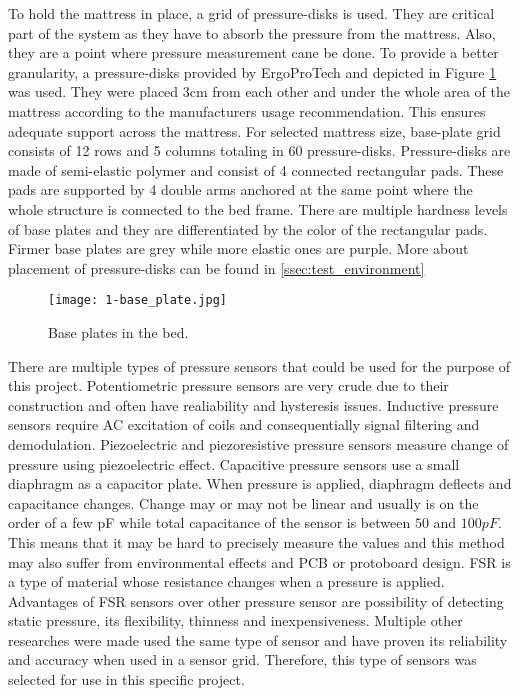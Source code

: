 To hold the mattress in place, a grid of pressure-disks is used. They are critical part of the system as they have to absorb the pressure from the mattress. Also, they are a point where pressure measurement cane be done. To provide a better granularity, a pressure-disks provided by ErgoProTech and depicted in Figure \ref{fig:base-plate} was used. They were placed 3cm from each other and under the whole area of the mattress according to the manufacturers usage recommendation. This ensures adequate support across the mattress. For selected mattress size, base-plate grid consists of 12 rows and 5 columns totaling in 60 pressure-disks. Pressure-disks are made of semi-elastic polymer and consist of 4 connected rectangular pads. These pads are supported by 4 double arms anchored at the same point where the whole structure is connected to the bed frame. There are multiple hardness levels of base plates and they are differentiated by the color of the rectangular pads. Firmer base plates are grey while more elastic ones are purple. More about placement of pressure-disks can be found in \autoref{ssec:test_environment}

\begin{figure}[h]
  \begin{center}
    \texttt{[image: 1-base\_plate.jpg]}
  \end{center}
  \caption{Base plates in the bed.}
  \label{fig:base-plate}
\end{figure}

There are multiple types of pressure sensors that could be used for the purpose of this project\cite{pressure_sensors}. Potentiometric pressure sensors are very crude due to their construction and often have realiability and hysteresis issues. Inductive pressure sensors require \ac{AC} excitation of coils and consequentially signal filtering and demodulation. Piezoelectric and piezoresistive pressure sensors measure change of pressure using piezoelectric effect. Capacitive pressure sensors use a small diaphragm as a capacitor plate. When pressure is applied, diaphragm deflects and capacitance changes. Change may or may not be linear and usually is on the order of a few \ac{pF} while total capacitance of the sensor is between $50$ and $100 pF$. This means that it may be hard to precisely measure the values and this method may also suffer from environmental effects and \ac{PCB} or protoboard design. \ac{FSR} is a type of material whose resistance changes when a pressure is applied. Advantages of \ac{FSR} sensors over other pressure sensor are possibility of detecting static pressure, its flexibility, thinness and inexpensiveness. Multiple other researches were made used the same type of sensor and have proven its reliability and accuracy when used in a sensor grid\cite{pillow_system_1}\cite{pillow_system_2}\cite{apnea_low_cost}. Therefore, this type of sensors was selected for use in this specific project.

